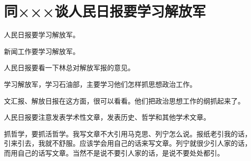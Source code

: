 \section[同×××谈人民日报要学习解放军（一九六四年一月八日）]{同×××谈人民日报要学习解放军}


人民日报要学习解放军。

新闻工作要学习解放军。

人民日报要看一下林总对解放军报的意见。

学习解放军，学习石油部，主要学习他们怎样抓思想政治工作。

文汇报、解放日报在这方面，很可以看看。他们把政治思想工作的纲抓起来了。

人民日报要注意发表学术性文章，发表历史、哲学和其他学术文章。

抓哲学，要抓活哲学。我写文章不大引用马克思、列宁怎么说。报纸老引我的话，引来引去，我就不舒服。应该学会用自己的话来写文章。列宁就很少引人家的话，而用自己的话写文章。当然不是说不要引人家的话，是说不要处处都引。

